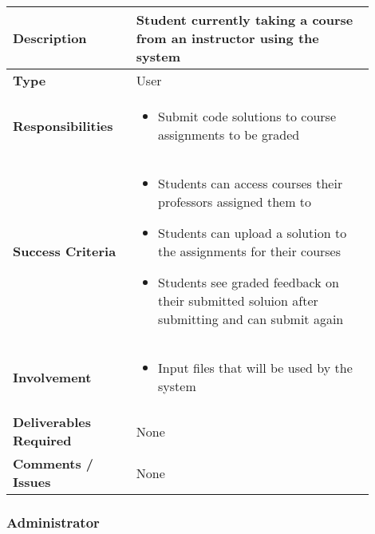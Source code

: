 \documentclass{article}
\begin{document}
\begin{tabular}{| p{0.3\linewidth} | p{0.6\linewidth} |}
  \hline
  \textbf{Description}& Student currently taking a course from an instructor using the system\\
  \hline
  \textbf{Type} & User\\
  \hline
  \textbf{Responsibilities} & \begin{itemize}
    \item Submit code solutions to course assignments to be graded
  \end{itemize}\\
  \hline
  \textbf{Success Criteria}& \begin{itemize}
    \item Students can access courses their professors assigned them to
    \item Students can upload a solution to the assignments for their courses
    \item Students see graded feedback on their submitted soluion after submitting and can submit again
  \end{itemize}\\
  \hline
  \textbf{Involvement} & \begin{itemize}
    \item Input files that will be used by the system
  \end{itemize}\\
  \hline
  \textbf{Deliverables Required}& None \\
  \hline
  \textbf{Comments / Issues} & None \\
  \hline
\end{tabular}

\subsubsection{Administrator}
\end{document}
